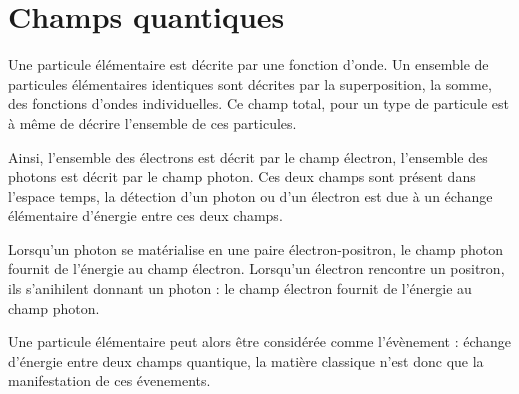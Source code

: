 
\section{Champs quantiques}
%
Une particule élémentaire est décrite par une fonction d'onde. Un ensemble de particules élémentaires identiques sont décrites par la superposition, la somme, des fonctions d'ondes individuelles. Ce champ total, pour un type de particule est à même de décrire l'ensemble de ces particules.

Ainsi, l'ensemble des électrons est décrit par le champ électron, l'ensemble des photons est décrit par le champ photon. Ces deux champs sont présent dans l'espace temps, la détection d'un photon ou d'un électron est due à un échange élémentaire d'énergie entre ces deux champs.

Lorsqu'un photon se matérialise en une paire électron-positron, le champ photon fournit de l'énergie au champ électron. Lorsqu'un électron rencontre un positron, ils s'anihilent donnant un photon : le champ électron fournit de l'énergie au champ photon.

Une particule élémentaire peut alors être considérée comme l'évènement : échange d'énergie entre deux champs quantique, la matière classique n'est donc que la manifestation de ces évenements.

